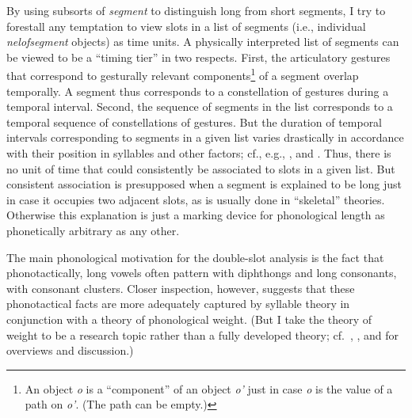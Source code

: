 \documentclass[output=paper]{langsci/langscibook}
\begin{document}
By using subsorts of \textit{segment}\/ to distinguish long from short
segments, I try to forestall any temptation to view slots in a list of
segments (i.e., individual \textit{nelofsegment}\/ objects) as time units. A
physically interpreted list of segments can be viewed to be a ``timing
tier'' in two respects.  First, the articulatory gestures that correspond
to gesturally relevant components\footnote{%
	An object \textit{o}\/ is a
  ``component'' of an object \textit{o'}\/ just in case \textit{o}\/ is the value
  of a path on \textit{o'}\/. (The path can be empty.)%
}
of a segment overlap temporally. A segment thus corresponds to a constellation of gestures
during a temporal interval.  Second, the sequence of segments in the list
corresponds to a temporal sequence of constellations of gestures.  But the
duration of temporal intervals corresponding to segments in a given list
varies drastically in accordance with their position in syllables and other
factors; cf., e.g., \cite{smit:91,smit:95}, and
\cite{bro:gol:88}. Thus,
there is no unit of time that could consistently be associated to slots in
a given list. But consistent association is presupposed when a segment is
explained to be long just in case it occupies two adjacent slots, as is
usually done in ``skeletal'' theories. Otherwise this explanation is just a
marking device for phonological length as phonetically arbitrary as any
other.


The main phonological motivation for the double-slot analysis is the fact
that phonotactically, long vowels often pattern with diphthongs and long
consonants, with consonant clusters. Closer inspection, however, suggests
that these phonotactical facts are more adequately captured by syllable
theory in conjunction with a theory of phonological weight. (But I take the
theory of weight to be a research topic rather than a fully developed
theory; cf.\ \citealt[{}\S{}8.4]{kens:94},
\citealt{perl:95}, and \citealt{hum:mul:eng:97} for
overviews and discussion.)
\end{document}
